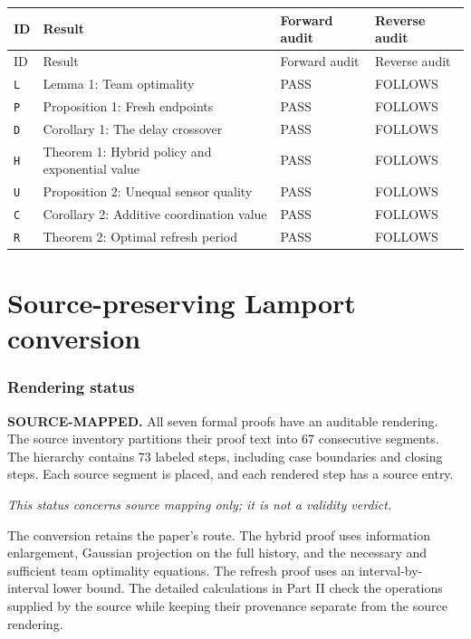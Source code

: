 \documentclass[11pt,letterpaper]{article}
\begin{document}
{\small \begin{longtable}{>{\raggedright\arraybackslash}p{.08\linewidth}>{\raggedright\arraybackslash}p{.34\linewidth}>{\raggedright\arraybackslash}p{.26\linewidth}>{\raggedright\arraybackslash}p{.20\linewidth}}
\toprule
ID & Result & Forward audit & Reverse audit \\
\midrule\endfirsthead
\toprule
ID & Result & Forward audit & Reverse audit \\
\midrule\endhead
\bottomrule\endfoot
\texttt{L} & Lemma 1: Team optimality & PASS & FOLLOWS \\[3pt]
\texttt{P} & Proposition 1: Fresh endpoints & PASS & FOLLOWS \\[3pt]
\texttt{D} & Corollary 1: The delay crossover & PASS & FOLLOWS \\[3pt]
\texttt{H} & Theorem 1: Hybrid policy and exponential value & PASS & FOLLOWS \\[3pt]
\texttt{U} & Proposition 2: Unequal sensor quality & PASS & FOLLOWS \\[3pt]
\texttt{C} & Corollary 2: Additive coordination value & PASS & FOLLOWS \\*[3pt]
\texttt{R} & Theorem 2: Optimal refresh period & PASS & FOLLOWS \\[3pt]
\end{longtable}}

\clearpage
{\small\setlength{\parskip}{0pt}\tableofcontents}
\clearpage

\part{Source-preserving Lamport conversion}
\section{Rendering status}
\textbf{SOURCE-MAPPED.} All seven formal proofs have an auditable rendering. The source inventory partitions their proof text into 67 consecutive segments. The hierarchy contains 73 labeled steps, including case boundaries and closing steps. Each source segment is placed, and each rendered step has a source entry.

\emph{This status concerns source mapping only; it is not a validity verdict.}

The conversion retains the paper's route. The hybrid proof uses information enlargement, Gaussian projection on the full history, and the necessary and sufficient team optimality equations. The refresh proof uses an interval-by-interval lower bound. The detailed calculations in Part II check the operations supplied by the source while keeping their provenance separate from the source rendering.
\end{document}
